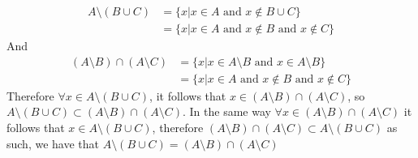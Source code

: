 \documentclass{article} %
\begin{document}
\begin{enumerate}
\begin{align*}
      A \setminus (B \cup C) &= \{x | x \in A \text{ and } x \notin B
      \cup C \} \\
      &= \{x | x \in A \text{ and } x \notin B \text{ and } x \notin C \}
    \end{align*}
    And
    \begin{align*}
      (A \setminus B) \cap (A \setminus C) &= \{x | x \in A \setminus
      B \text{ and }  x \in A \setminus B \} \\
      &= \{x | x \in A \text{ and } x \notin B \text{ and } x \notin C\}
    \end{align*}
    Therefore $\forall x \in A \setminus (B \cup C)$, it follows that
    $x \in (A \setminus B) \cap (A \setminus C)$, so $A \setminus (B
    \cup C) \subset (A \setminus B) \cap (A \setminus C)$. In the
    same way $\forall x \in (A\setminus B) \cap (A \setminus C)$ it
    follows that $x \in A \setminus (B\cup C)$, therefore $(A
    \setminus B) \cap (A\setminus C) \subset A \setminus (B \cup C)$
    as such, we have that $A \setminus (B \cup C) = (A \setminus B)
    \cap (A \setminus C)$
\end{enumerate}
\end{document}
